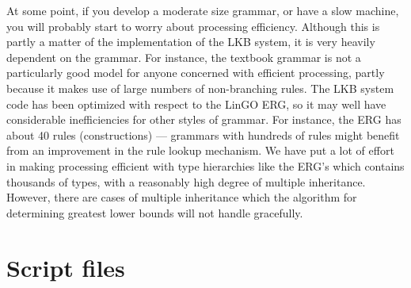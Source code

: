 \documentclass[12pt]{report}
\begin{document}
At some point, if you develop a moderate size grammar, or have a slow machine,
you will probably start to worry about processing efficiency.
Although this is partly a matter of the implementation of the LKB
system, it is very heavily dependent on the grammar.  For instance,
the textbook grammar is not a particularly
good model for anyone concerned with efficient processing, partly 
because it makes use
of large numbers of non-branching rules.
The LKB system code has been optimized with respect to the LinGO
ERG, so it may well have considerable inefficiencies for other
styles of grammar.  For instance, the ERG has about 40 rules (constructions)
--- grammars with hundreds of rules
might benefit from an improvement in the rule lookup mechanism.
We have put a lot of effort in making processing efficient
with type hierarchies like the ERG's
which contains thousands of types, with a reasonably
high degree of multiple inheritance.  However, there are
cases of multiple inheritance which the algorithm
for determining greatest lower bounds will not handle gracefully.

\section{Script files}
\label{script-adv}
\end{document}
